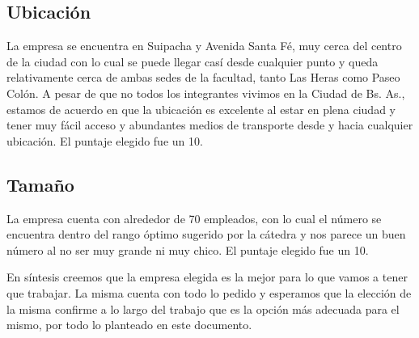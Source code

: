 \documentclass[12pt,a4paper,spanish]{article}
\begin{document}
\subsection{Ubicaci\'{o}n}
La empresa se encuentra en Suipacha y Avenida Santa F\'{e}, muy cerca del centro de la ciudad con lo cual se puede llegar cas\'{i} desde cualquier punto y queda relativamente cerca de ambas sedes de la facultad, tanto Las Heras como Paseo Col\'{o}n. A pesar de que no todos los integrantes vivimos en la Ciudad de Bs. As., estamos de acuerdo en que la ubicaci\'{o}n es excelente al estar en plena ciudad y tener muy f\'{a}cil acceso y abundantes medios de transporte desde y hacia cualquier ubicaci\'on. El puntaje elegido fue un 10.

\subsection{Tama\~{n}o}
La empresa cuenta con alrededor de 70 empleados, con lo cual el n\'umero se encuentra dentro del rango \'optimo sugerido por la c\'atedra y nos parece un buen n\'{u}mero al no ser muy grande ni muy chico. El puntaje elegido fue un 10.

En s\'{i}ntesis creemos que la empresa elegida es la mejor para lo que vamos a tener que trabajar. La misma cuenta con todo lo pedido y esperamos que la elecci\'{o}n de la misma confirme a lo largo del trabajo que es la opci\'on m\'as adecuada para el mismo, por todo lo planteado en este documento.


\normalsize
\end{document}
